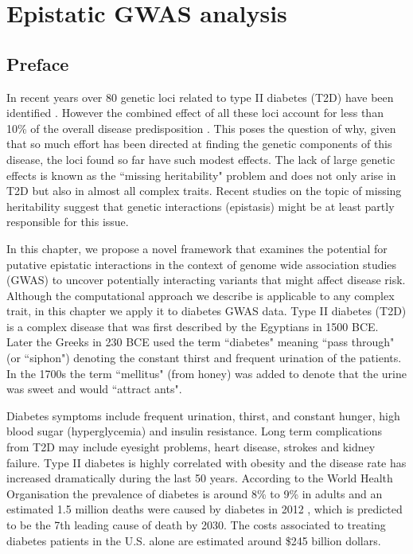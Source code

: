
\chapter{Epistatic GWAS analysis\label{ch:gwas}}

\section{Preface}

In recent years over 80 genetic loci related to type II diabetes (T2D) have been identified \cite{morris2012large, consortium2014genome}.
However the combined effect of all these loci account for less than 10\% of the overall disease predisposition \cite{manolio2009finding}. 
This poses the question of why, given that so much effort has been directed at finding the genetic components of this disease, the loci found so far have such modest effects. 
The lack of large genetic effects is known as the ``missing heritability" problem and does not only arise in T2D but also in almost all complex traits. 
Recent studies on the topic of missing heritability \cite{zuk2012mystery, zuk2014searching} suggest that genetic interactions (epistasis) might be at least partly responsible for this issue.

In this chapter, we propose a novel framework that examines the potential for putative epistatic interactions in the context of genome wide association studies (GWAS) to uncover potentially interacting variants that might affect disease risk. 
Although the computational approach we describe is applicable to any complex trait, in this chapter we apply it to diabetes GWAS data.
Type II diabetes (T2D) is a complex disease that was first described by the Egyptians in 1500 BCE. Later the Greeks in 230 BCE used the term ``diabetes" meaning ``pass through" (or ``siphon") denoting the constant thirst and frequent urination of the patients. In the 1700s the term ``mellitus" (from honey) was added to denote that the urine was sweet and would ``attract ants".

Diabetes symptoms include frequent urination, thirst, and constant hunger, high blood sugar (hyperglycemia) and insulin resistance. 
Long term complications from T2D may include eyesight problems, heart disease, strokes and kidney failure. 
Type II diabetes is highly correlated with obesity and the disease rate has increased dramatically during the last 50 years. 
According to the World Health Organisation the prevalence of diabetes is around 8\% to 9\% in adults and an estimated 1.5 million deaths were caused by diabetes in 2012 \cite{guariguata2014global}, which is predicted to be the 7th leading cause of death by 2030. 
The costs associated to treating diabetes patients in the U.S. alone are estimated around \$245 billion dollars.

